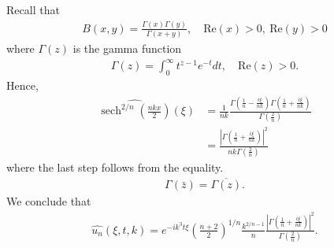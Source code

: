 \documentclass[12pt,reqno]{amsart}
\numberwithin{equation}{section}  %
\newcommand{\wh}{\widehat}
\DeclareMathOperator{\sech}{sech}
\begin{document}
       Recall that
       \begin{equation*}
       \begin{split}
         B(x,y) = \frac{\Gamma(x) \Gamma(y)}{\Gamma(x+y)}, \quad
         \text{Re}(x) > 0, \ \text{Re}(y) > 0
       \end{split}
       \end{equation*}
       where $\Gamma(z)$ is the gamma function
       \begin{equation*}
       \begin{split}
         \Gamma(z) = \int_{0}^{\infty} t^{z-1} e^{-t} dt, \quad
         \text{Re}(z) > 0.
       \end{split}
       \end{equation*}
       Hence,
       \begin{equation*}
         \begin{split}
           \wh{\sech^{2/n}\left( \frac{nkx}{2} \right)}(\xi)
           & =
           \frac{1}{nk}
           \frac{\Gamma \left (\frac{1}{n} - \frac{i \xi}{nk} \right ) \Gamma \left (
           \frac{1}{n} + \frac{i \xi}{nk} \right )}{\Gamma \left (\frac{2}{n} \right )}
           \\
           & = 
           \frac{| \Gamma \left (\frac{1}{n} + \frac{i \xi}{nk} \right)|^{2}}
           {nk \Gamma \left (\frac{2}{n} \right )}
         \end{split}
       \end{equation*}
       where the last step follows from the equality.
       \begin{equation*}
       \begin{split}
         \Gamma(\bar{z}) = \overline{\Gamma(z)}.
       \end{split}
       \end{equation*}
       We conclude that
       \begin{equation*}
         \begin{split}
           \wh{u_{n}}(\xi,t,k) = e^{-ik^{3}t \xi}
           \left( \frac{n+2}{2} \right)^{1/n} \frac{k^{2/n -1}}{n}
           \frac{|\Gamma \left (\frac{1}{n} + \frac{i \xi}{nk} \right)|^{2}}
           {\Gamma \left (\frac{2}{n}
           \right )}.
         \end{split}
       \end{equation*}
\end{document}
